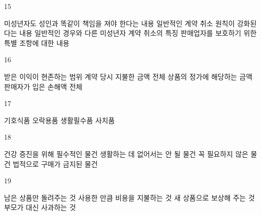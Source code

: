 \documentclass[fs9,seriesRus]{korfarm-base}
\begin{document}
\begin{kfSentenceUnit}{15}{}
\begin{kfChoices}
\kfChoice 미성년자도 성인과 똑같이 책임을 져야 한다는 내용
\kfChoice 일반적인 계약 취소 원칙이 강화된다는 내용
\kfChoice 일반적인 경우와 다른 미성년자 계약 취소의 특징
\kfChoice 판매업자를 보호하기 위한 특별 조항에 대한 내용
\end{kfChoices}
\end{kfSentenceUnit}

\begin{kfSentenceUnit}{16}{}
\begin{kfChoices}
\kfChoice 받은 이익이 현존하는 범위
\kfChoice 계약 당시 지불한 금액 전체
\kfChoice 상품의 정가에 해당하는 금액
\kfChoice 판매자가 입은 손해액 전체
\end{kfChoices}
\end{kfSentenceUnit}

\begin{kfSentenceUnit}{17}{}
\begin{kfChoices}
\kfChoice 기호식품
\kfChoice 오락용품
\kfChoice 생활필수품
\kfChoice 사치품
\end{kfChoices}
\end{kfSentenceUnit}

\begin{kfSentenceUnit}{18}{}
\begin{kfChoices}
\kfChoice 건강 증진을 위해 필수적인 물건
\kfChoice 생활하는 데 없어서는 안 될 물건
\kfChoice 꼭 필요하지 않은 물건
\kfChoice 법적으로 구매가 금지된 물건
\end{kfChoices}
\end{kfSentenceUnit}

\begin{kfSentenceUnit}{19}{}
\begin{kfChoices}
\kfChoice 남은 상품만 돌려주는 것
\kfChoice 사용한 만큼 비용을 지불하는 것
\kfChoice 새 상품으로 보상해 주는 것
\kfChoice 부모가 대신 사과하는 것
\end{kfChoices}
\end{kfSentenceUnit}
\end{document}
